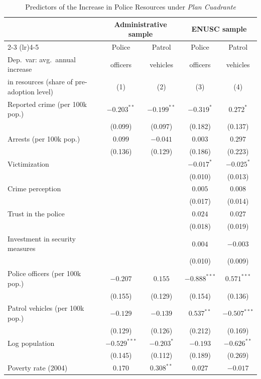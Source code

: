 \begin{table}[H]
\centering
\caption{Predictors of the Increase in Police Resources under \emph{Plan Cuadrante}}
\label{tab:resourcecorrelates}
\begin{threeparttable}
\small
\setlength{\tabcolsep}{6pt}
\renewcommand{\arraystretch}{1.1}
\begin{tabular}{@{}l cc cc@{}}
\toprule
& \multicolumn{2}{c}{Administrative sample} & \multicolumn{2}{c}{ENUSC sample} \\
\cmidrule(lr){2-3} \cmidrule(lr){4-5}
& Police & Patrol & Police & Patrol \\
Dep.\ var: avg.\ annual increase & officers & vehicles & officers & vehicles \\
in resources (share of pre-adoption level) & (1) & (2) & (3) & (4) \\
\midrule
Reported crime (per 100k pop.) & $-0.203^{**}$ & $-0.199^{**}$ & $-0.319^{*}$ & $0.272^{*}$ \\
 & (0.099) & (0.097) & (0.182) & (0.137) \\
Arrests (per 100k pop.) & $0.099$ & $-0.041$ & $0.003$ & $0.297$ \\
 & (0.136) & (0.129) & (0.186) & (0.223) \\
Victimization &  &  & $-0.017^{*}$ & $-0.025^{*}$ \\
 &  &  & (0.010) & (0.013) \\
Crime perception &  &  & $0.005$ & $0.008$ \\
 &  &  & (0.017) & (0.014) \\
Trust in the police &  &  & $0.024$ & $0.027$ \\
 &  &  & (0.018) & (0.019) \\
Investment in security measures &  &  & $0.004$ & $-0.003$ \\
 &  &  & (0.010) & (0.009) \\
Police officers (per 100k pop.) & $-0.207$ & $0.155$ & $-0.888^{***}$ & $0.571^{***}$ \\
 & (0.155) & (0.129) & (0.154) & (0.136) \\
Patrol vehicles (per 100k pop.) & $-0.129$ & $-0.139$ & $0.537^{**}$ & $-0.507^{***}$ \\
 & (0.129) & (0.126) & (0.212) & (0.169) \\
Log population & $-0.529^{***}$ & $-0.203^{*}$ & $-0.193$ & $-0.626^{**}$ \\
 & (0.145) & (0.112) & (0.189) & (0.269) \\
Poverty rate (2004) & $0.170$ & $0.308^{**}$ & $0.027$ & $-0.017$ \\

\end{tabular}
\end{threeparttable}
\end{table}

